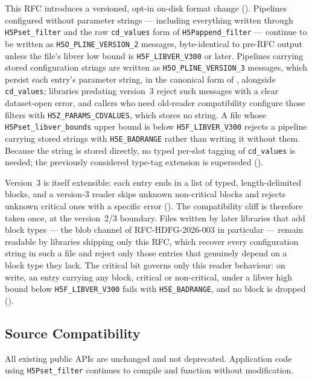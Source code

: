 \documentclass[../RFC-HDFG-2026-001.tex]{subfiles}
\begin{document}
This RFC introduces a versioned, opt-in on-disk format change
().  Pipelines configured without parameter
strings --- including everything written through \texttt{H5Pset\_filter}
and the raw \texttt{cd\_values} form of \texttt{H5Pappend\_filter} ---
continue to be written as \texttt{H5O\_PLINE\_VERSION\_2} messages,
byte-identical to pre-RFC output unless the file's libver low bound is
\texttt{H5F\_LIBVER\_V300} or later.  Pipelines carrying
stored configuration strings are written as \texttt{H5O\_PLINE\_VERSION\_3}
messages, which persist each entry's parameter string, in the canonical
form of , alongside
\texttt{cd\_values}; libraries predating version~3 reject such messages
with a clear dataset-open error, and callers who need old-reader
compatibility configure those filters with
\texttt{H5Z\_PARAMS\_CDVALUES}, which stores no string.  A file whose
\texttt{H5Pset\_libver\_bounds} upper bound is below
\texttt{H5F\_LIBVER\_V300} rejects a pipeline carrying stored strings with
\texttt{H5E\_BADRANGE} rather than writing it without them.  Because the
string is stored directly, no typed per-slot tagging of \texttt{cd\_values}
is needed; the previously considered type-tag extension is superseded
().

Version~3 is itself extensible: each entry ends in a list of typed,
length-delimited blocks, and a version-3 reader skips unknown
non-critical blocks and rejects unknown critical ones with a specific
error ().  The compatibility cliff is
therefore taken once, at the version~2/3 boundary.  Files written by
later libraries that add block types --- the blob channel of
RFC-HDFG-2026-003 in particular --- remain readable by libraries shipping
only this RFC, which recover every configuration string in such a file
and reject only those entries that genuinely depend on a block type they
lack.  The critical bit governs only this reader behaviour: on write, an
entry carrying any block, critical or non-critical, under a libver high
bound below \texttt{H5F\_LIBVER\_V300} fails with \texttt{H5E\_BADRANGE},
and no block is dropped ().

\subsection{Source Compatibility}

All existing public APIs are unchanged and not deprecated. Application code
using \texttt{H5Pset\_filter} continues to compile and function without modification.
\end{document}

